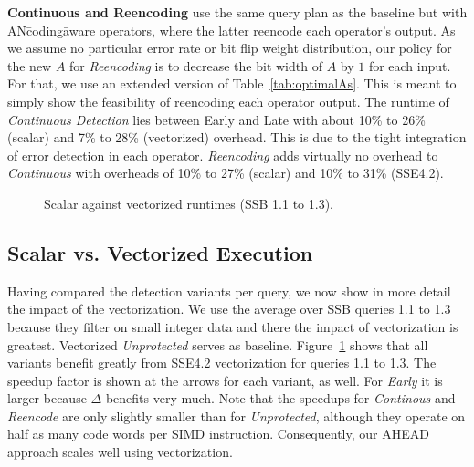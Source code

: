 \textbf{Continuous and Reencoding} use the same query plan as the baseline but with AN\=coding\=aware operators, where the latter reencode each operator's output. As we assume no particular error rate or bit flip weight distribution, our policy for the new \(A\) for \emph{Reencoding} is to decrease the bit width of \(A\) by $1$ for each input. For that, we use an extended version of Table~\ref{tab:optimalAs}. This is meant to simply show the feasibility of reencoding each operator output. The runtime of \emph{Continuous Detection} lies between Early and Late with about 10\% to 26\% (scalar) and 7\% to 28\% (vectorized) overhead. This is due to the tight integration of error detection in each operator. \emph{Reencoding} adds virtually no overhead to \emph{Continuous} with overheads of 10\% to 27\% (scalar) and 10\% to 31\% (SSE4.2).


\begin{figure}%
	\footnotesize
	\graphicspath{{results/ssb/}}
	\vspace{-1.5em}
	\caption{Scalar against vectorized runtimes (SSB 1.1 to 1.3).}%
	\label{fig:vectorVSscalar}%
	\vspace{-0.4cm}
\end{figure}


\subsection{Scalar vs. Vectorized Execution}
Having compared the detection variants per query, we now show in more detail the impact of the vectorization. We use the average over SSB queries 1.1 to 1.3 because they filter on small integer data and there the impact of vectorization is greatest. Vectorized \emph{Unprotected} serves as baseline. Figure~\ref{fig:vectorVSscalar} shows that all variants benefit greatly from SSE4.2 vectorization for queries 1.1 to 1.3. The speedup factor is shown at the arrows for each variant, as well. For \emph{Early} it is larger because \(\Delta\) benefits very much. Note that the speedups for \emph{Continous} and \emph{Reencode} are only slightly smaller than for \emph{Unprotected}, although they operate on half as many code words per SIMD instruction. Consequently, our AHEAD approach scales well using vectorization.




